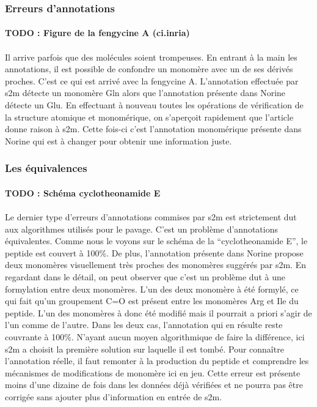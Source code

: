 \documentclass[12pt,french,twoside]{report}
\begin{document}
\subsubsection{Erreurs d'annotations}

\paragraph{TODO : Figure de la fengycine A (ci.inria)}

\paragraph{}Il arrive parfois que des molécules soient trompeuses.
En entrant à la main les annotations, il est possible de confondre un monomère avec un de ses dérivés proches.
C'est ce qui est arrivé avec la fengycine A.
L'annotation effectuée par s2m détecte un monomère Gln alors que l'annotation présente dans Norine détecte un Glu.
En effectuant à nouveau toutes les opérations de vérification de la structure atomique et monomérique, on s'aperçoit rapidement que l'article donne raison à s2m.
Cette fois-ci c'est l'annotation monomérique présente dans Norine qui est à changer pour obtenir une information juste.


\subsubsection{Les équivalences}

\paragraph{TODO : Schéma cyclotheonamide E}

\paragraph{}Le dernier type d'erreurs d'annotations commises par s2m est strictement dut aux algorithmes utilisés pour le pavage.
C'est un problème d'annotations équivalentes.
Comme nous le voyons sur le schéma de la ``cyclotheonamide E'', le peptide est couvert à 100\%.
De plus, l'annotation présente dans Norine propose deux monomères visuellement très proches des monomères suggérés par s2m.
En regardant dans le détail, on peut observer que c'est un problème dut à une formylation entre deux monomères.
L'un des deux monomère à été formylé, ce qui fait qu'un groupement C=O est présent entre les monomères Arg et Ile du peptide.
L'un des monomères à donc été modifié mais il pourrait a priori s'agir de l'un comme de l'autre.
Dans les deux cas, l'annotation qui en résulte reste couvrante à 100\%.
N'ayant aucun moyen algorithmique de faire la différence, ici s2m a choisit la première solution sur laquelle il est tombé.
Pour connaître l'annotation réelle, il faut remonter à la production du peptide et comprendre les mécanismes de modifications de monomère ici en jeu.
Cette erreur est présente moins d'une dizaine de fois dans les données déjà vérifiées et ne pourra pas être corrigée sans ajouter plus d'information en entrée de s2m.
\end{document}
